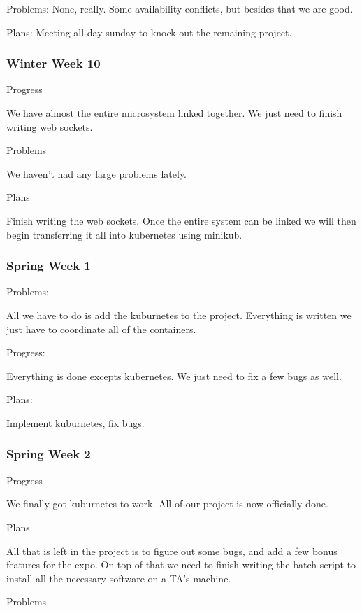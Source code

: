 \documentclass[onecolumn, draftclsnofoot,10pt, compsoc]{IEEEtran}
\begin{document}
 

Problems: None, really. Some availability conflicts, but besides that we are good.

 

Plans: Meeting all day sunday to knock out the remaining project.

\subsubsection*{Winter Week 10}

Progress

We have almost the entire microsystem linked together. We just need to finish writing web sockets.

Problems

We haven't had any large problems lately.

Plans

Finish writing the web sockets. Once the entire system can be linked we will then begin transferring it all into kubernetes using minikub.

\subsubsection*{Spring Week 1}

Problems:

All we have to do is add the kuburnetes to the project. Everything is written we just have to coordinate all of the containers.

Progress:

Everything is done excepts kubernetes. We just need to fix a few bugs as well.

Plans:

Implement kuburnetes, fix bugs.

\subsubsection*{Spring Week 2}

Progress

We finally got kuburnetes to work. All of our project is now officially done.

Plans

All that is left in the project is to figure out some bugs, and add a few bonus features for the expo. On top of that we need to finish writing the batch script to install all the necessary software on a TA's machine.

Problems
\end{document}
